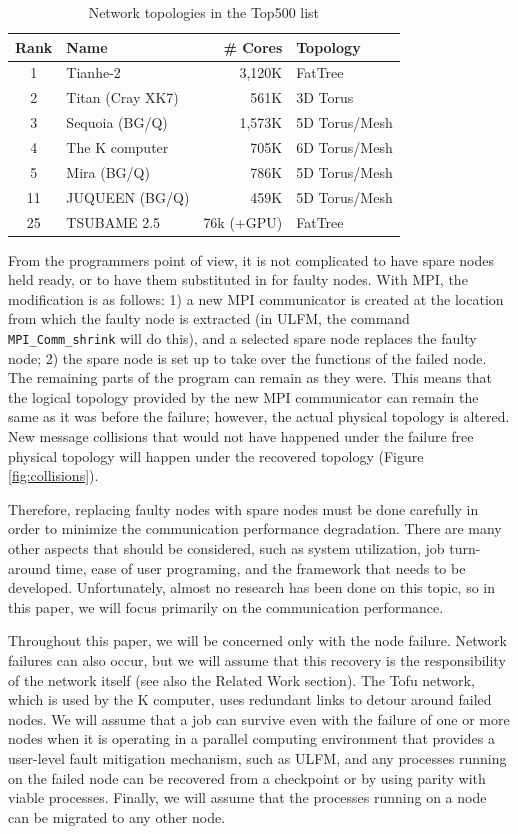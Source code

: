 \documentclass[Afour,times,sageh]{sagej}
\begin{document}
\begin{table}[htb]
\centering
\caption{Network topologies in the Top500 list\citep{top500}}
\label{tbl:top5-network}
{\small
\begin{tabular}{c|l|r|l}
\hline
Rank & Name & \# Cores & Topology \\
\hline
\hline
1 & Tianhe-2 & 3,120K & FatTree \\
2 & Titan (Cray XK7) & 561K & 3D Torus \\
3 & Sequoia (BG/Q) & 1,573K & 5D Torus/Mesh \\
4 & The K computer & 705K & 6D Torus/Mesh \\
5 & Mira (BG/Q) & 786K & 5D Torus/Mesh \\
\hline
11 & JUQUEEN (BG/Q) & 459K & 5D Torus/Mesh \\
\hline
25 & TSUBAME 2.5 & 76k (+GPU) & FatTree \\
\hline
\end{tabular}
}
\end{table}

From the programmers point of view, it is not complicated to have
spare nodes held ready, or to have them substituted in for faulty
nodes. With MPI, the modification is as follows: 1) a new MPI
communicator is created at the location from which the faulty node is
extracted (in ULFM, the command {\tt MPI\_Comm\_shrink} will do this),
and a selected spare node replaces the faulty node; 2) the spare node
is set up to take over the functions of the failed node. The remaining
parts of the program can remain as they were. This means that the
logical topology provided by the new MPI communicator can remain the
same as it was before the failure; however, the actual physical
topology is altered. New message collisions that would not
have happened under the failure free physical topology will happen
under the recovered topology (Figure \ref{fig:collisions}).

Therefore, replacing faulty nodes with spare nodes must be done
carefully in order to minimize the communication performance
degradation. There are many other aspects that should be considered,
such as system utilization, job turn-around time, ease of user
programing, and the framework that needs to be
developed. Unfortunately, almost no research has been done on this
topic, so in this paper, we will focus primarily on the communication
performance.

Throughout this paper, we will be concerned only with the node
failure. Network failures can also occur, but we will assume that this
recovery is the responsibility of the network
itself\citep{Domke:2014:FND:2683593.2683659} (see also the Related
Work section). The Tofu network, which is used by the K
computer, uses redundant links to detour around failed
nodes\citep{sumimoto-k}\citep{5331902}. We will assume that a job can survive even
with the failure of one or more nodes when it is operating in a
parallel computing environment that provides a user-level fault
mitigation mechanism, such as ULFM, and any processes running on the
failed node can be recovered from a checkpoint or by using parity with
viable processes. Finally, we will assume that the processes running
on a node can be migrated to any other node.
\end{document}
